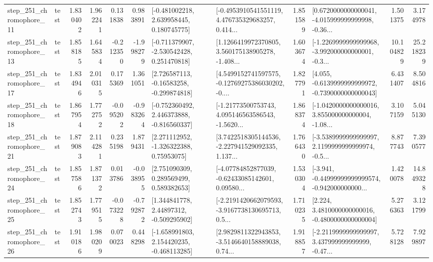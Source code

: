 \begin{tabular}{llrrrrllrlrr}
  step\_251\_chromophore\_11 &      test &      1.830402 &    1.962241 &      0.131838 &  0.983891 &    [-0.481002218, 2.639958445, 0.180745775] &  [-0.4953910541551119, 4.476735329683257, 0.414... &       1.851589 &  [0.6720000000000041, -4.015999999999998, -0.36... &            1.501375 &          3.174978 \\
  step\_251\_chromophore\_13 &      test &      1.858185 &    1.645834 &     -0.212350 & -1.998279 &   [-0.711379907, -2.530542428, 0.251470818] &  [1.1266419972370805, 3.560175138905278, -1.408... &       1.603674 &  [-1.2269999999999968, -3.992000000000001, -0.3... &           10.104829 &         25.218239 \\
  step\_251\_chromophore\_17 &      test &      1.834946 &    2.010315 &      0.175369 &  1.361051 &    [2.726587113, -0.16583258, -0.299874818] &  [4.5499152741597575, -0.12769275386030202, -0.... &       1.827791 &  [4.055, -0.6139999999999972, -0.7390000000000043] &            6.431407 &          8.504816 \\
  step\_251\_chromophore\_18 &      test &      1.867954 &    1.772752 &     -0.095202 & -0.983264 &   [-0.752360492, 2.446373888, -0.816560337] &  [-1.21773500753743, 4.095146563586543, -1.5620... &       1.868374 &  [-1.0420000000000016, 3.855000000000004, -1.08... &            3.107159 &          5.045130 \\
  step\_251\_chromophore\_21 &      test &      1.879083 &    2.114281 &      0.235198 &  1.879431 &     [2.271112952, -1.326322388, 0.75953075] &  [3.7422518305144536, -2.227941529092335, 1.137... &       1.766430 &  [-3.5389999999999997, 2.1199999999999974, -0.5... &            8.877743 &          7.390577 \\
  step\_251\_chromophore\_24 &      test &      1.857586 &    1.871372 &      0.013786 & -0.038955 &     [2.751090309, 0.289569499, 0.589382653] &  [-4.07784852877039, -0.62433085142601, 0.09580... &       1.530304 &  [-3.941, -0.44999999999999574, -0.942000000000... &            1.420078 &         14.849328 \\
  step\_251\_chromophore\_25 &      test &      1.852743 &    1.779515 &     -0.073228 & -0.792872 &     [1.344841778, 2.44897312, -0.509295902] &  [-2.2191420662079593, -3.9167738130695713, 0.5... &       1.710235 &   [2.224, 3.4810000000000016, -0.4800000000000004] &            5.276363 &          3.121799 \\
  step\_251\_chromophore\_26 &      test &      1.910186 &    1.980209 &      0.070023 &  0.448298 &   [-1.658991803, 2.154420235, -0.468113285] &  [2.9829811322943853, -3.5146640158889038, 0.74... &       1.918857 &  [-2.2119999999999997, 3.437999999999999, -0.47... &            5.728128 &          7.929897 \\

\end{tabular}
